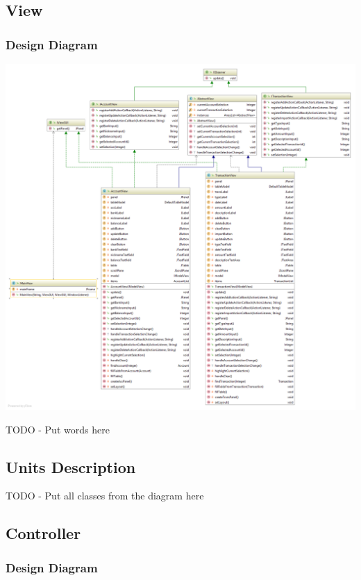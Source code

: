 \documentclass[12pt]{article}
\begin{document}
\begin{center}
\begin{tabular}{|l|l|}
\end{tabular}
\end{center}

\subsection{View}

\subsubsection{Design Diagram}

\includegraphics[width=\textwidth,height=\textheight,keepaspectratio]{Diagrams/UML/View.png}
\bigskip

TODO - Put words here

\subsection{Units Description}

TODO - Put all classes from the diagram here

\subsection{Controller}

\subsubsection{Design Diagram}
\end{document}
